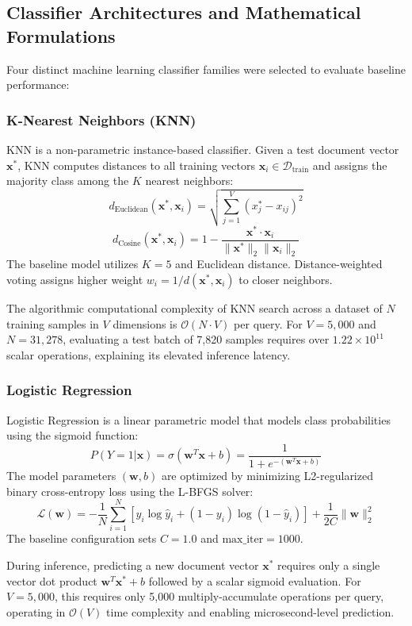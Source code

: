 \documentclass[conference]{IEEEtran}
\begin{document}
\subsection{Classifier Architectures and Mathematical Formulations}
Four distinct machine learning classifier families were selected to evaluate baseline performance:

\subsubsection{K-Nearest Neighbors (KNN)}
KNN is a non-parametric instance-based classifier. Given a test document vector $\mathbf{x}^*$, KNN computes distances to all training vectors $\mathbf{x}_i \in \mathcal{D}_{\text{train}}$ and assigns the majority class among the $K$ nearest neighbors:
$$d_{\text{Euclidean}}(\mathbf{x}^*, \mathbf{x}_i) = \sqrt{\sum_{j=1}^{V} (x^*_j - x_{ij})^2}$$
$$d_{\text{Cosine}}(\mathbf{x}^*, \mathbf{x}_i) = 1 - \frac{\mathbf{x}^* \cdot \mathbf{x}_i}{\|\mathbf{x}^*\|_2 \|\mathbf{x}_i\|_2}$$
The baseline model utilizes $K=5$ and Euclidean distance. Distance-weighted voting assigns higher weight $w_i = 1 / d(\mathbf{x}^*, \mathbf{x}_i)$ to closer neighbors.

The algorithmic computational complexity of KNN search across a dataset of $N$ training samples in $V$ dimensions is $\mathcal{O}(N \cdot V)$ per query. For $V=5,000$ and $N=31,278$, evaluating a test batch of 7,820 samples requires over $1.22 \times 10^{11}$ scalar operations, explaining its elevated inference latency.

\subsubsection{Logistic Regression}
Logistic Regression is a linear parametric model that models class probabilities using the sigmoid function:
$$P(Y=1|\mathbf{x}) = \sigma(\mathbf{w}^T \mathbf{x} + b) = \frac{1}{1 + e^{-(\mathbf{w}^T \mathbf{x} + b)}}$$
The model parameters $(\mathbf{w}, b)$ are optimized by minimizing L2-regularized binary cross-entropy loss using the L-BFGS solver:
$$\mathcal{L}(\mathbf{w}) = -\frac{1}{N}\sum_{i=1}^{N}\left[y_i \log \hat{y}_i + (1-y_i)\log(1-\hat{y}_i)\right] + \frac{1}{2C}\|\mathbf{w}\|_2^2$$
The baseline configuration sets $C=1.0$ and $\text{max\_iter}=1000$.

During inference, predicting a new document vector $\mathbf{x}^*$ requires only a single vector dot product $\mathbf{w}^T \mathbf{x}^* + b$ followed by a scalar sigmoid evaluation. For $V=5,000$, this requires only 5,000 multiply-accumulate operations per query, operating in $\mathcal{O}(V)$ time complexity and enabling microsecond-level prediction.
\end{document}
